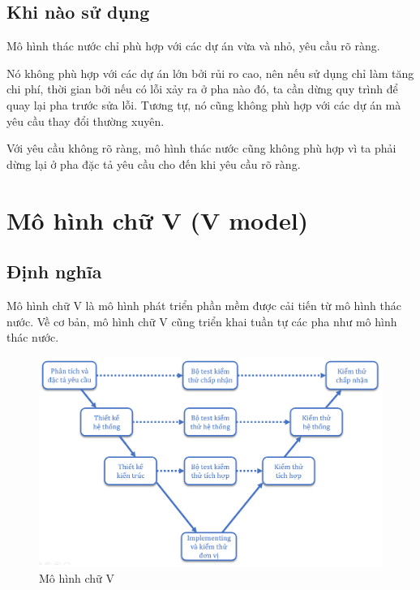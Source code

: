 \documentclass[14pt]{extarticle}
\begin{document}
\subsection{Khi nào sử dụng}
Mô hình thác nước chỉ phù hợp với các dự án vừa và nhỏ, yêu cầu rõ ràng.

Nó không phù hợp với các dự án lớn bởi rủi ro cao, nên nếu sử dụng chỉ làm tăng
chi phí, thời gian bởi nếu có lỗi xảy ra ở pha nào đó, ta cần dừng quy trình để
quay lại pha trước sửa lỗi. Tương tự, nó cũng không phù hợp với các dự án mà
yêu cầu thay đổi thường xuyên.

Với yêu cầu không rõ ràng, mô hình thác nước cũng không phù hợp vì ta phải
dừng lại ở pha đặc tả yêu cầu cho đến khi yêu cầu rõ ràng.



\newpage
\section{Mô hình chữ V (V model)}
\subsection{Định nghĩa}
Mô hình chữ V là mô hình phát triển phần mềm được cải tiến từ
mô hình thác nước. Về cơ bản, mô hình chữ V cũng triển khai tuần tự
các pha như mô hình thác nước.
\begin{figure}[h]
  \centering
  \includegraphics[width=\textwidth]{v-model.png}
  \caption{Mô hình chữ V}
  \label{fig:v-model}
\end{figure}
\end{document}
